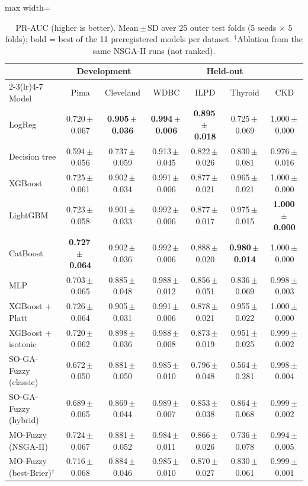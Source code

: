 \begin{table}[t]
\centering
\scriptsize
\setlength{\tabcolsep}{3pt}
\caption{PR-AUC (higher is better). Mean\,$\pm$\,SD over 25 outer test folds (5 seeds $\times$ 5 folds); bold = best of the 11 preregistered models per dataset. $^\dagger$Ablation from the same NSGA-II runs (not ranked).}
\label{tab:prauc}
\begin{adjustbox}{max width=\linewidth}
\begin{tabular}{lcccccc}
\toprule
 & \multicolumn{2}{c}{Development} & \multicolumn{4}{c}{Held-out} \\
\cmidrule(lr){2-3}\cmidrule(lr){4-7}
Model & Pima & Cleveland & WDBC & ILPD & Thyroid & CKD \\
\midrule
LogReg & 0.720\,$\pm$\,0.067 & \textbf{0.905\,$\pm$\,0.036} & \textbf{0.994\,$\pm$\,0.006} & \textbf{0.895\,$\pm$\,0.018} & 0.725\,$\pm$\,0.069 & 1.000\,$\pm$\,0.000 \\
Decision tree & 0.594\,$\pm$\,0.056 & 0.737\,$\pm$\,0.059 & 0.913\,$\pm$\,0.045 & 0.822\,$\pm$\,0.026 & 0.830\,$\pm$\,0.081 & 0.976\,$\pm$\,0.016 \\
XGBoost & 0.725\,$\pm$\,0.061 & 0.902\,$\pm$\,0.034 & 0.991\,$\pm$\,0.006 & 0.877\,$\pm$\,0.021 & 0.965\,$\pm$\,0.021 & 1.000\,$\pm$\,0.000 \\
LightGBM & 0.723\,$\pm$\,0.058 & 0.901\,$\pm$\,0.033 & 0.992\,$\pm$\,0.006 & 0.877\,$\pm$\,0.017 & 0.975\,$\pm$\,0.015 & \textbf{1.000\,$\pm$\,0.000} \\
CatBoost & \textbf{0.727\,$\pm$\,0.064} & 0.902\,$\pm$\,0.036 & 0.992\,$\pm$\,0.006 & 0.888\,$\pm$\,0.020 & \textbf{0.980\,$\pm$\,0.014} & 1.000\,$\pm$\,0.000 \\
MLP & 0.703\,$\pm$\,0.065 & 0.885\,$\pm$\,0.048 & 0.988\,$\pm$\,0.012 & 0.856\,$\pm$\,0.051 & 0.836\,$\pm$\,0.069 & 0.998\,$\pm$\,0.003 \\
XGBoost + Platt & 0.726\,$\pm$\,0.064 & 0.905\,$\pm$\,0.031 & 0.991\,$\pm$\,0.006 & 0.878\,$\pm$\,0.021 & 0.955\,$\pm$\,0.022 & 1.000\,$\pm$\,0.000 \\
XGBoost + isotonic & 0.720\,$\pm$\,0.062 & 0.898\,$\pm$\,0.036 & 0.988\,$\pm$\,0.008 & 0.873\,$\pm$\,0.019 & 0.951\,$\pm$\,0.025 & 0.999\,$\pm$\,0.002 \\
SO-GA-Fuzzy (classic) & 0.672\,$\pm$\,0.050 & 0.881\,$\pm$\,0.050 & 0.985\,$\pm$\,0.010 & 0.796\,$\pm$\,0.048 & 0.564\,$\pm$\,0.281 & 0.998\,$\pm$\,0.004 \\
SO-GA-Fuzzy (hybrid) & 0.689\,$\pm$\,0.065 & 0.869\,$\pm$\,0.044 & 0.989\,$\pm$\,0.007 & 0.853\,$\pm$\,0.038 & 0.864\,$\pm$\,0.068 & 0.999\,$\pm$\,0.002 \\
MO-Fuzzy (NSGA-II) & 0.724\,$\pm$\,0.067 & 0.881\,$\pm$\,0.052 & 0.984\,$\pm$\,0.011 & 0.866\,$\pm$\,0.026 & 0.736\,$\pm$\,0.078 & 0.994\,$\pm$\,0.005 \\
\midrule
MO-Fuzzy (best-Brier)$^\dagger$ & 0.716\,$\pm$\,0.068 & 0.884\,$\pm$\,0.046 & 0.985\,$\pm$\,0.010 & 0.870\,$\pm$\,0.027 & 0.830\,$\pm$\,0.061 & 0.999\,$\pm$\,0.001 \\
\bottomrule
\end{tabular}
\end{adjustbox}
\end{table}
